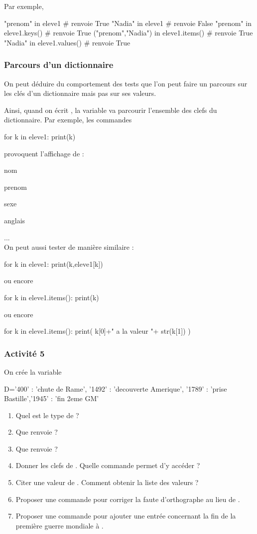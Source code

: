 \documentclass[11pt,a4paper,french,twoside]{PMCours}
\begin{document}
Par exemple,
\begin{Python}
"prenom" in eleve1                   # renvoie True
"Nadia" in eleve1                    # renvoie False
"prenom" in eleve1.keys()            # renvoie True
("prenom","Nadia") in eleve1.items() # renvoie True
"Nadia" in eleve1.values()           # renvoie True
\end{Python}
\subsubsection*{Parcours d'un dictionnaire}
On peut déduire du comportement des tests que l'on peut faire un parcours sur 
les clés d'un dictionnaire mais pas sur ses valeurs.

Ainsi, quand on écrit , la variable  va 
parcourir l'ensemble des clefs du dictionnaire. 
Par exemple, les commandes 
\begin{Python}
for k in eleve1:
	print(k)
\end{Python}
provoquent l'affichage de :

nom

prenom

sexe

anglais

... 
\medskip\\
On peut aussi tester de manière similaire : 
\begin{Python}
for k in eleve1:
	print(k,eleve1[k])
\end{Python}
ou encore 
\begin{Python}
for k in eleve1.items():
	print(k)
\end{Python}
ou encore 
\begin{Python}
for k in eleve1.items():
	print( k[0]+" a la valeur "+ str(k[1]) )
\end{Python}

\subsubsection*{Activité 5}
On crée la variable 
\begin{Python}
D={'400' : 'chute de Rame', '1492' : 'decouverte Amerique', '1789' : 'prise Bastille','1945' : 'fin 2eme GM'}
\end{Python}
\begin{enumerate}
\item Quel est le type de  ?
\item Que renvoie  ?  
\item Que renvoie  ?
\item Donner les clefs de . Quelle commande permet d'y accéder ?
\item Citer une valeur de . Comment obtenir la liste des valeurs ?
\item Proposer une commande pour corriger la faute d'orthographe  au lieu de .
\item Proposer une commande pour ajouter une entrée concernant la fin de la première guerre mondiale à . 
\end{enumerate} 
\end{document}
